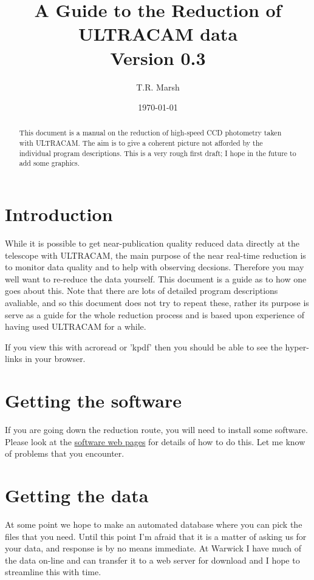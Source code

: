 \documentclass[10pt,a4paper,twocolumn]{article}
\author{T.R. Marsh}
\title{A Guide to the Reduction of ULTRACAM data\\ Version 0.3}
\date{\today}
\newcommand{\main}{http://quetzel.csc.warwick.ac.uk/phsaap/software}
\begin{document}
\maketitle

\begin{abstract}
This document is a manual on the reduction of high-speed 
CCD photometry taken with ULTRACAM. The aim is to give a coherent
picture not afforded by the individual program descriptions.
This is a very rough first draft; I hope in the future to add
some graphics.
\end{abstract}

\section{Introduction}

While it is possible to get near-publication quality reduced data 
directly at the telescope with ULTRACAM, the main purpose of the 
near real-time reduction is to monitor data quality and to help with
observing decsions. Therefore you may well want to re-reduce the data
yourself. This document is a guide as to how one goes about this.
Note that there are lots of detailed program descriptions avaliable,
and so this document does not try to repeat these, rather its purpose is
serve as a guide for the whole reduction process and is based upon experience
of having used ULTRACAM for a while.

If you view this with acroread or 'kpdf' then you should be able to
see the hyper-links in your browser.

\section{Getting the software}

If you are going down the reduction route, you will need to install some software.
Please look at the \href{\main/index.html}{software web pages} for details
of how to do this. Let me know of problems that you encounter.

\section{Getting the data}

At some point we hope to make an automated database where you can pick
the files that you need. Until this point I'm afraid that it is a
matter of asking us for your data, and response is by no means
immediate. At Warwick I have much of the data on-line and can transfer
it to a web server for download and I hope to streamline this with time.
\end{document}
